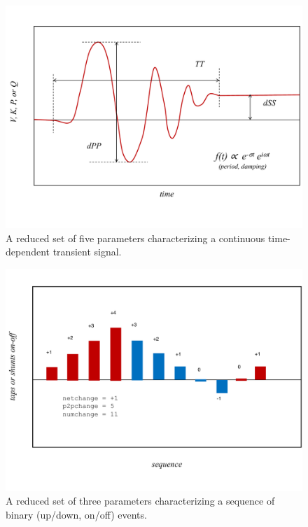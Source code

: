 \documentclass[11pt, a4paper, twoside, titlepage]{article}
\begin{document}
\begin{figure}
  \centering
  \includegraphics[width=\columnwidth]{figs/transient_characteristics_1}
  \caption{A reduced set of five parameters characterizing a continuous
    time-dependent transient signal.}
  \label{fig:tcharacteristics1}
\end{figure}

\begin{figure}
  \centering
  \includegraphics[width=\columnwidth]{figs/transient_characteristics_2}
  \caption{A reduced set of three parameters characterizing a sequence of binary
    (up/down, on/off) events.}
  \label{fig:tcharacteristics2}
\end{figure}
\end{document}
